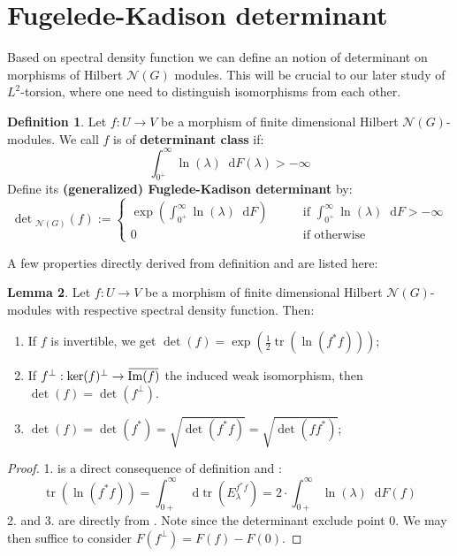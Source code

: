 \documentclass[11pt]{report}
\theoremstyle{definition}
\newtheorem{Def}{Definition}[chapter]
\newtheorem{Lemma}[Def]{Lemma}
\theoremstyle{plain}
\DeclareMathOperator{\tr}{tr}
\DeclareMathOperator{\im}{Im}
\newcommand{\vna}{\mathcal{N}}
\newcommand{\overbar}[1]{\mkern 1.5mu\overline{\mkern-1.5mu#1\mkern-1.5mu}\mkern 1.5mu}
\renewcommand{\bar}{\overbar}
\newcommand{\mass}[1]{\mathop{}\mathrm{d}{#1}}
\begin{document}
\section{Fugelede-Kadison determinant}
Based on spectral density function we can define an notion of determinant on morphisms of Hilbert $\vna(G)$ modules. This will be crucial to our later study of $L^2$-torsion, where one need to distinguish isomorphisms from each other.
\begin{Def}\label{3.11}
	Let $f:U\to V$ be a morphism of finite dimensional Hilbert $\vna(G)$-modules. We call $f$ is of \textbf{determinant class} if:
	\begin{equation}
	\int_{0^+}^\infty\ln(\lambda)\mass{F(\lambda)}>-\infty
	\end{equation}
	Define its \textbf{(generalized) Fuglede-Kadison determinant} by:
	\begin{equation}
	\det{}_{\vna(G)}(f):=\begin{cases}
	\exp(\int_{0^+}^\infty\ln(\lambda)\mass{F})\qquad &\text{if }\int_{0^+}^\infty\ln(\lambda)\mass{F}>-\infty\\
	0 \qquad &\text{if otherwise}
	\end{cases}
	\end{equation}	
\end{Def}
A few properties directly derived from definition and  are listed here:
\begin{Lemma}\label{3.15}
	Let $f:U\to V$ be a morphism of finite dimensional Hilbert $\vna(G)$-modules with respective spectral density function. Then:
\begin{enumerate}
	\item If $f$ is invertible, we get $\det(f)=\exp (\frac{1}{2}\tr(\ln(f^*f)))$;
	\item If $f^\perp: \ker(f)^\perp \to \bar{\im(f)}$ the induced weak isomorphism, then $\det(f)=\det(f^\perp)$.
	\item $\det(f)=\det(f^*)=\sqrt{\det(f^*f)}=\sqrt{\det(ff^*)}$;
\end{enumerate}
\end{Lemma}
\begin{proof}
	1. is a direct consequence of definition and :
	\begin{equation*}
	\tr(\ln(f^*f))=\int^\infty_{0+}\mass{\tr(E^{f^*f}_\lambda)}=2\cdot \int^\infty_{0+}\ln(\lambda)\mass{F(f)}
	\end{equation*}
	2. and 3. are directly from . Note since the determinant exclude point $0$. We may then suffice to consider $F(f^\perp)=F(f)-F(0)$.
\end{proof}
\end{document}
